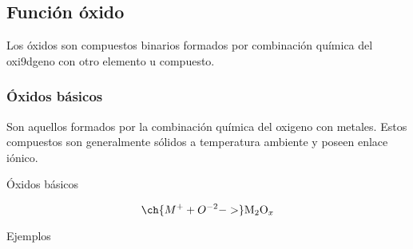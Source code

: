 \subsection*{Función óxido}
Los óxidos son compuestos binarios formados por combinación química del oxi9dgeno con otro elemento u compuesto. 
\subsubsection*{Óxidos básicos}
Son aquellos formados por la combinación química del oxigeno con metales. Estos compuestos son generalmente sólidos a temperatura ambiente y poseen enlace iónico.
\begin{Theorem*} {Óxidos básicos}
	\begin{figure}[H]
		\centering
	\end{figure}
	$$\ch{M^{+} + O^{-2} ->}\mathrm{M}_2\mathrm{O}_x$$
\end{Theorem*}
\noindent Ejemplos
